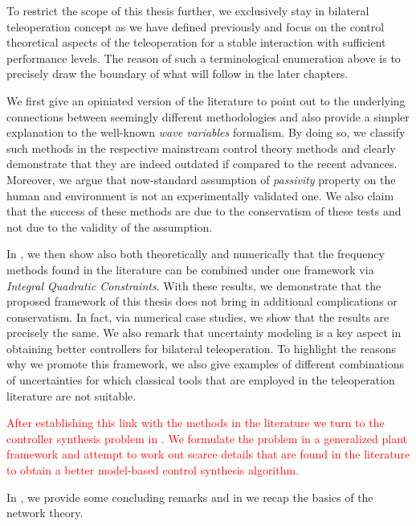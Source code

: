 To restrict the scope of this thesis further, we exclusively stay in bilateral teleoperation concept as we have defined previously and focus on the control theoretical aspects of the teleoperation for a stable interaction with sufficient performance levels. The reason of such a terminological enumeration above is to precisely draw the boundary of what will follow in the later chapters. 

We first give an opiniated version of the literature to point out to the underlying connections between seemingly different methodologies and also provide a simpler explanation to the well-known \emph{wave variables} formalism. By doing so, we classify such methods in the respective mainstream control theory methods and clearly demonstrate that they are indeed outdated if compared to the recent advances. Moreover, we argue that now-standard assumption of \emph{passivity} property on the human and environment is not an experimentally validated one. We also claim that the success of these methods are due to the conservatism of these tests and not due to the validity of the assumption.

In , we then show also both theoretically and numerically that the frequency methods found in the literature can be combined under one framework via \emph{Integral Quadratic Constraints}. With these results, we demonstrate that the proposed framework of this thesis does not bring in additional complications or conservatism. In fact, via numerical case studies, we show that the results are precisely the same. We also remark that uncertainty modeling is a key aspect in obtaining better controllers for bilateral teleoperation. To highlight the reasons why we promote this framework, we also give examples of different combinations of uncertainties for which classical tools that are employed in the teleoperation literature are not suitable. 


\textcolor{red}{After establishing this link with the methods in the literature we turn to the controller synthesis problem in . We formulate the problem in a generalized plant framework and attempt to work out scarce details that are found in the literature to obtain a better model-based control synthesis algorithm.}  

In , we provide some concluding remarks and in  we recap the basics of the network theory.

